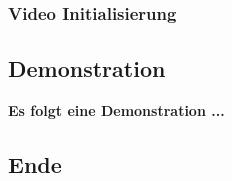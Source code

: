 \begin{frame}
  \frametitle{Video Initialisierung}
  \makeset
\end{frame}

\subsection{Demonstration}
\begin{frame} %

  \textbf{Es folgt eine Demonstration ...}
\end{frame}

\subsection{Ende}
\begin{frame} %
  \center
  \textbf{}
\end{frame}